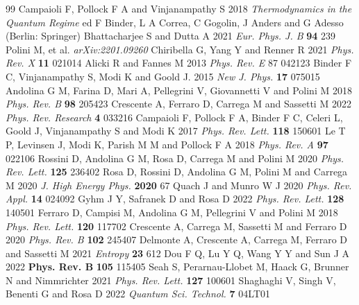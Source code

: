 \documentclass[12pt]{iopart}
\begin{document}
\begin{thebibliography}{99}
%
 Campaioli F, Pollock F A and Vinjanampathy S 2018 \emph{Thermodynamics in the Quantum Regime} ed F Binder, L A Correa,
C Gogolin, J Anders and G Adesso (Berlin: Springer)
%
 Bhattacharjee S and Dutta A 2021 \emph{Eur. Phys. J. B} \textbf{94} 239
%
 Polini M, et al. %
\emph{	arXiv:2201.09260}
%
 Chiribella G, Yang Y and Renner R 2021 \emph{Phys. Rev. X} \textbf{11} 021014
%
  Alicki R and Fannes M 2013 \emph{Phys. Rev. E} 87 042123
%
 Binder F C, Vinjanampathy S, Modi K and Goold J. 2015 \emph{New J. Phys.} \textbf{17} 075015
%
  Andolina G M, Farina D, Mari A, Pellegrini V, Giovannetti V and Polini M 2018 \emph{Phys. Rev. B} \textbf{98} 205423
%
 Crescente A, Ferraro D, Carrega M and Sassetti M 2022 \emph{Phys. Rev. Research} \textbf{4} 033216
%
 Campaioli F, Pollock F A, Binder F C, Celeri L, Goold J, Vinjanampathy S and Modi K 2017 \emph{Phys. Rev. Lett.} \textbf{118} 150601
%
 Le T P, Levinsen J, Modi K, Parish M M and Pollock F A 2018 \emph{Phys. Rev. A} \textbf{97} 022106
%
 Rossini D, Andolina G M, Rosa D, Carrega M and Polini M 2020 \emph{Phys. Rev. Lett.} \textbf{125} 236402
%
 Rosa D, Rossini D, Andolina G M, Polini M and Carrega M 2020 \emph{J.
High Energy Phys.} \textbf{2020} 67
%
 Quach J and Munro W J 2020 \emph{Phys. Rev. Appl.} \textbf{14} 024092
%
 Gyhm J Y, Safranek D and Rosa D 2022 \emph{Phys. Rev. Lett.} \textbf{128} 140501
%
 Ferraro D, Campisi M, Andolina G M, Pellegrini V and Polini M 2018 \emph{Phys. Rev. Lett.} \textbf{120} 117702
%
 Crescente A, Carrega M, Sassetti M and Ferraro D 2020 \emph{Phys. Rev. B} \textbf{102} 245407
%
 Delmonte A, Crescente A, Carrega M, Ferraro D and Sassetti M 2021 \emph{Entropy} \textbf{23} 612
%
 Dou F Q, Lu Y Q, Wang Y Y and Sun J A 2022 \textbf{Phys. Rev. B} \textbf{105} 115405
%
 Seah S, Perarnau-Llobet M, Haack G, Brunner N and Nimmrichter 2021 \emph{Phys. Rev. Lett.} \textbf{127} 100601
%
 Shaghaghi V, Singh V, Benenti G and Rosa D 2022 \emph{Quantum Sci. Technol.} \textbf{7} 04LT01

\end{thebibliography}
\end{document}
